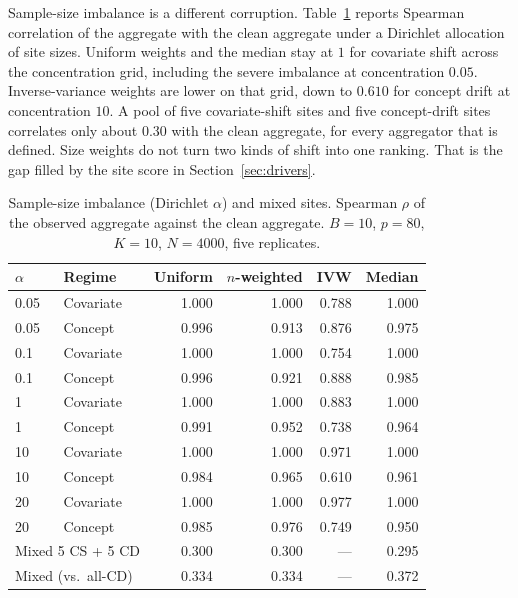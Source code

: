 

Sample-size imbalance is a different corruption.
Table~\ref{tab:federated_imbalance} reports Spearman correlation of the
aggregate with the clean aggregate under a Dirichlet allocation of site
sizes.
Uniform weights and the median stay at \(1\) for covariate shift across
the concentration grid, including the severe imbalance at concentration
\(0.05\).
Inverse-variance weights are lower on that grid, down to \(0.610\) for
concept drift at concentration \(10\).
A pool of five covariate-shift sites and five concept-drift sites
correlates only about \(0.30\) with the clean aggregate, for every
aggregator that is defined.
Size weights do not turn two kinds of shift into one ranking.
That is the gap filled by the site score in
Section~\ref{sec:drivers}.

\begin{table}[t]
\centering
\caption{Sample-size imbalance (Dirichlet \(\alpha\)) and mixed sites.
Spearman \(\rho\) of the observed aggregate against the clean aggregate.
\(B=10\), \(p=80\), \(K=10\), \(N=4000\), five replicates.}
\label{tab:federated_imbalance}
\small
\setlength{\tabcolsep}{4pt}
\begin{tabular}{l l rrrr}
\toprule
\(\alpha\) & Regime & Uniform & \(n\)-weighted & IVW & Median \\
\midrule
0.05 & Covariate & 1.000 & 1.000 & 0.788 & 1.000 \\
0.05 & Concept   & 0.996 & 0.913 & 0.876 & 0.975 \\
0.1  & Covariate & 1.000 & 1.000 & 0.754 & 1.000 \\
0.1  & Concept   & 0.996 & 0.921 & 0.888 & 0.985 \\
1    & Covariate & 1.000 & 1.000 & 0.883 & 1.000 \\
1    & Concept   & 0.991 & 0.952 & 0.738 & 0.964 \\
10   & Covariate & 1.000 & 1.000 & 0.971 & 1.000 \\
10   & Concept   & 0.984 & 0.965 & 0.610 & 0.961 \\
20   & Covariate & 1.000 & 1.000 & 0.977 & 1.000 \\
20   & Concept   & 0.985 & 0.976 & 0.749 & 0.950 \\
\midrule
\multicolumn{2}{l}{Mixed 5 CS + 5 CD} & 0.300 & 0.300 & ---   & 0.295 \\
\multicolumn{2}{l}{Mixed (vs.\ all-CD)}  & 0.334 & 0.334 & ---   & 0.372 \\
\bottomrule
\end{tabular}
\end{table}

